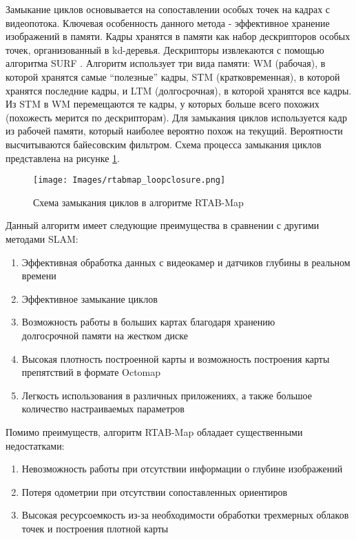 \documentclass{mipt-thesis-bs}
\begin{document}
Замыкание циклов основывается на сопоставлении особых точек на кадрах с видеопотока. Ключевая особенность данного метода - эффективное хранение изображений в памяти. Кадры хранятся в памяти как набор дескрипторов особых точек, организованный в kd-деревья. Дескрипторы извлекаются с помощью алгоритма SURF \cite{bay2006surf}. Алгоритм использует три вида памяти: WM (рабочая), в которой хранятся самые “полезные” кадры, STM (кратковременная), в которой хранятся последние кадры, и LTM (долгосрочная), в которой хранятся все кадры. Из STM в WM перемещаются те кадры, у которых больше всего похожих (похожесть мерится по дескрипторам). Для замыкания циклов используется кадр из рабочей памяти, который наиболее вероятно похож на текущий. Вероятности высчитываются байесовским фильтром. Схема процесса замыкания циклов представлена на рисунке \ref{figureloopclosing}.

\begin{figure}
	\centering
	\texttt{[image: Images/rtabmap\_loopclosure.png]}
	\caption{Схема замыкания циклов в алгоритме RTAB-Map}
	\label{figureloopclosing}
\end{figure}

Данный алгоритм имеет следующие преимущества в сравнении с другими методами SLAM:
\begin{enumerate}
	\item {Эффективная обработка данных с видеокамер и датчиков глубины в реальном времени}
	\item {Эффективное замыкание циклов}
	\item {Возможность работы в больших картах благодаря хранению\\ долгосрочной памяти на жестком диске}
	\item {Высокая плотность построенной карты и возможность построения карты препятствий в формате Octomap}
	\item {Легкость использования в различных приложениях, а также большое количество настраиваемых параметров}
\end{enumerate}
Помимо преимуществ, алгоритм RTAB-Map обладает существенными недостатками:
\begin{enumerate}
\item {Невозможность работы при отсутствии информации о глубине изображений}
\item {Потеря одометрии при отсутствии сопоставленных ориентиров}
\item {Высокая ресурсоемкость из-за необходимости обработки трехмерных облаков точек и построения плотной карты}
\end{enumerate}
\end{document}

